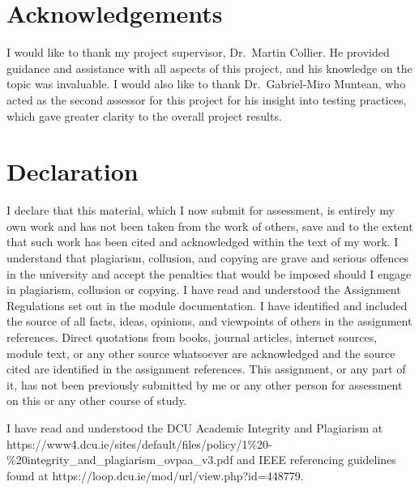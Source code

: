 \documentclass[11pt,a4paper,headinclude=false,footinclude=false]{scrreprt}
\begin{document}


\setcounter{secnumdepth}{1}
\setcounter{tocdepth}{1}
\tableofcontents
\listoftables
\listoffigures
\chapter{Acknowledgements}\label{acknowledgements}

I would like to thank my project supervisor, Dr.~Martin Collier. He
provided guidance and assistance with all aspects of this project, and
his knowledge on the topic was invaluable. I would also like to thank
Dr.~Gabriel-Miro Muntean, who acted as the second assessor for this
project for his insight into testing practices, which gave greater
clarity to the overall project results.

\begingroup
\renewcommand{\cleardoublepage}{} \renewcommand{\clearpage}{}

\chapter{Declaration}\label{declaration}

\endgroup

I declare that this material, which I now submit for assessment, is
entirely my own work and has not been taken from the work of others,
save and to the extent that such work has been cited and acknowledged
within the text of my work. I understand that plagiarism, collusion, and
copying are grave and serious offences in the university and accept the
penalties that would be imposed should I engage in plagiarism, collusion
or copying. I have read and understood the Assignment Regulations set
out in the module documentation. I have identified and included the
source of all facts, ideas, opinions, and viewpoints of others in the
assignment references. Direct quotations from books, journal articles,
internet sources, module text, or any other source whatsoever are
acknowledged and the source cited are identified in the assignment
references. This assignment, or any part of it, has not been previously
submitted by me or any other person for assessment on this or any other
course of study.

I have read and understood the DCU Academic Integrity and Plagiarism at
https://www4.dcu.ie/sites/default/files/policy/1\%20-\%20integrity\_and\_plagiarism\hspace{0pt}\_ovpaa\_v3.pdf
and IEEE referencing guidelines found at
https://loop.dcu.ie/mod/url\hspace{0pt}/view.php?id=448779.
\end{document}
